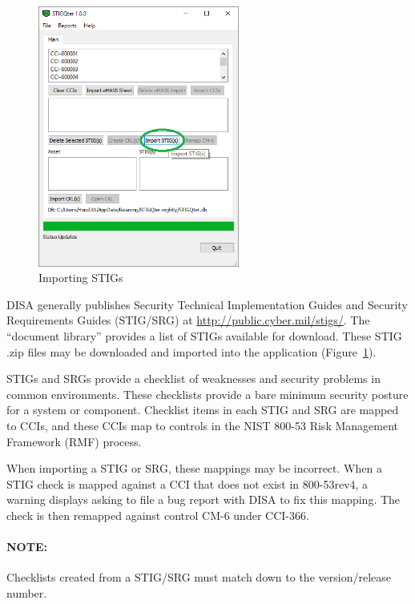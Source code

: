 \documentclass[letterpaper, 10pt, twoside]{article}
\begin{document}
\begin{figure}
	\centering
	\vspace{-10pt}
	\includegraphics[width=0.59\textwidth]{images/main-02.png}
	\caption{Importing STIGs}
	\vspace{-10pt}
	\label{fig:importstigs}
\end{figure}
DISA generally publishes Security Technical Implementation Guides and Security Requirements Guides (STIG/SRG) at \url{http://public.cyber.mil/stigs/}. The ``document library'' provides a list of STIGs available for download. These STIG .zip files may be downloaded and imported into the application (Figure~\ref{fig:importstigs}).

STIGs and SRGs provide a checklist of weaknesses and security problems in common environments. These checklists provide a bare minimum security posture for a system or component. Checklist items in each STIG and SRG are mapped to CCIs, and these CCIs map to controls in the NIST 800-53 Risk Management Framework (RMF) process.

When importing a STIG or SRG, these mappings may be incorrect. When a STIG check is mapped against a CCI that does not exist in 800-53rev4, a warning displays asking to file a bug report with DISA to fix this mapping. The check is then remapped against control CM-6 under CCI-366.

\paragraph{NOTE:} Checklists created from a STIG/SRG must match down to the version/release number.
\end{document}
